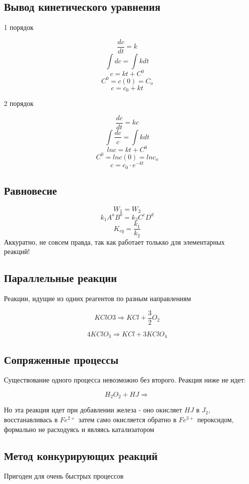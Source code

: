 \documentclass[11pt]{article}
\begin{document}
\subsection{Вывод кинетического уравнения}

\begin{center}1 порядок \end{center}

$$\frac{dc}{dt} = k$$
$$\int dc = \int{kdt}$$
$$c = kt + C^0$$
$$C^0 = c(0) = C_o$$
$$c = c_0 + kt$$

\begin{center}2 порядок\end{center}


$$\frac{dc}{dt} = kc$$
$$\int \frac{dc}c = \int{kdt}$$
$$ln c = kt + C^0$$
$$C^0 = ln c(0) =  ln c_o$$
$$c = c_0 \cdot e^{-kt}$$

\subsection{Равновесие}

$$W_1 = W_2$$
$$k_1 A^aB^b = k_2 C^cD^d$$
$$K_{eq} =\frac{ k_1 }{k_2}$$
Аккуратно, не совсем правда, так как работает толькко для элементарных реакций!


\subsection{Параллельные реакции}

Реакции, идущие из одних реагентов по разным направлениям

$$KClO3 \Rightarrow KCl + \frac 32 O_2$$

$$4KClO_3 \Rightarrow KCl + 3KClO_4$$


\subsection{Сопряженные процессы}

Существование одного процесса невозможно без второго. Реакция ниже не идет:

$$H_2O_2 + HJ \Rightarrow $$

Но эта реакция идет при добавлении железа - оно окисляет $HJ$ в $J_2$, восстанавливась в $Fe^{2+}$ затем само окисляется обратно в $Fe^{3+}$ пероксидом, формально не расходуясь и являясь катализатором

\subsection{Метод конкурирующих реакций}
 Пригоден для очень быстрых процессов
 
\end{document}

